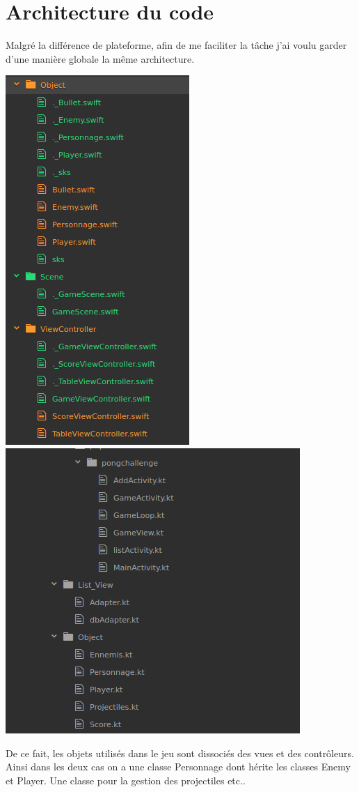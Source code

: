 \documentclass{article}
\begin{document}
\section{Architecture du code}
Malgré la différence de plateforme, afin de me faciliter la tâche j'ai voulu garder d'une manière globale la même architecture. 
\begin{center}
    \includegraphics[scale=0.3]{ScreenIOS.png}
    \includegraphics[scale=0.4]{AndroidArchi.png}
\end{center}
De ce fait, les objets utilisés dans le jeu sont dissociés des vues et des contrôleurs. \\ 
Ainsi dans les deux cas on a une classe Personnage dont hérite les classes Enemy et Player. Une classe pour la gestion des projectiles etc..\\
\end{document}
